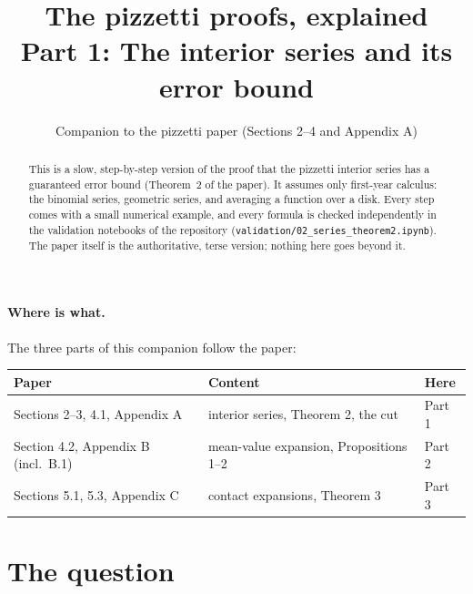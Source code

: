 \documentclass[11pt,a4paper]{article}
\title{The pizzetti proofs, explained\\[4pt]\large Part 1: The interior series and its error bound}
\author{Companion to the pizzetti paper (Sections 2--4 and Appendix A)}
\date{}
\theoremstyle{remark}
\newcommand{\nb}[1]{\texttt{validation/#1}}
\begin{document}
\maketitle

\begin{abstract}
\noindent This is a slow, step-by-step version of the proof that the pizzetti interior series
has a guaranteed error bound (Theorem~2 of the paper). It assumes only first-year calculus:
the binomial series, geometric series, and averaging a function over a disk. Every step comes
with a small numerical example, and every formula is checked independently in the validation
notebooks of the repository (\nb{02\_series\_theorem2.ipynb}). The paper itself is the
authoritative, terse version; nothing here goes beyond it.
\end{abstract}

\paragraph{Where is what.} The three parts of this companion follow the paper:
\begin{center}
\begin{tabular}{lll}
\toprule
Paper & Content & Here\\
\midrule
Sections 2--3, 4.1, Appendix A & interior series, Theorem 2, the cut & Part 1\\
Section 4.2, Appendix B (incl.\ B.1) & mean-value expansion, Propositions 1--2 & Part 2\\
Sections 5.1, 5.3, Appendix C & contact expansions, Theorem 3 & Part 3\\
\bottomrule
\end{tabular}
\end{center}

\tableofcontents

\section{The question}
\end{document}
